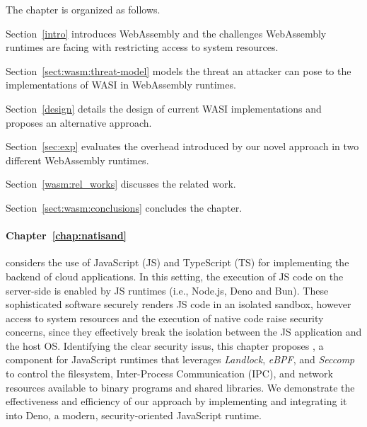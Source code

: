 \smallskip
\noindent The chapter is organized as follows.
\begin{compactitem}
    \item Section~\ref{intro} introduces WebAssembly and the
     challenges WebAssembly runtimes are facing with restricting
     access to system resources.
    \item Section~\ref{sect:wasm:threat-model} models the threat
     an attacker can pose to the implementations of WASI in
     WebAssembly runtimes.
    \item Section~\ref{design} details the design of current
     WASI implementations and proposes an alternative approach.
    \item Section~\ref{sec:exp} evaluates the overhead introduced by
     our novel approach in two different WebAssembly runtimes.
    \item Section~\ref{wasm:rel_works} discusses the related work.
    \item Section~\ref{sect:wasm:conclusions} concludes the chapter.
\end{compactitem}
\medskip

\paragraph*{Chapter~\ref{chap:natisand}} considers the use of
JavaScript (JS) and TypeScript (TS) for implementing the backend of
cloud applications. In this setting, the execution of JS code on the
server-side is enabled by JS runtimes (i.e., Node.js, Deno and Bun).
These sophisticated software securely renders JS code in an isolated
sandbox, however access to system resources and the execution of
native code raise security concerns, since they effectively break the
isolation between the JS application and the host OS. Identifying the
clear security issus, this chapter proposes \natisand, a component for
JavaScript runtimes that leverages {\em Landlock}, {\em eBPF}, and
{\em Seccomp} to control the filesystem, Inter-Process Communication
(IPC), and network resources available to binary programs and shared
libraries. We demonstrate the effectiveness and efficiency of our
approach by implementing and integrating it into Deno, a modern,
security-oriented JavaScript runtime.


